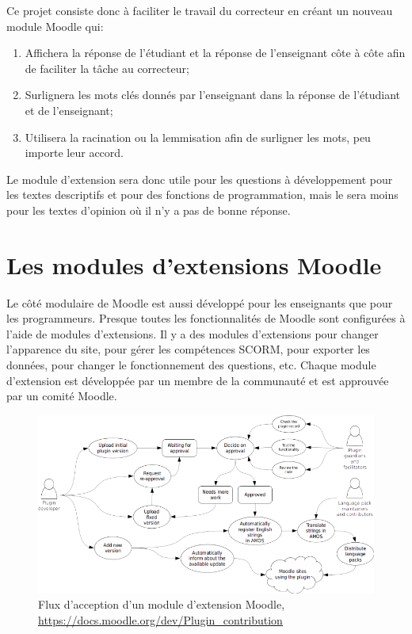 Ce projet consiste donc à faciliter le travail du correcteur en créant un nouveau module Moodle qui:

\begin{enumerate}
  \item Affichera la réponse de l'étudiant et la réponse de l'enseignant côte à côte afin de faciliter la tâche au correcteur;
  \item Surlignera les mots clés donnés par l'enseignant dans la réponse de l'étudiant et de l'enseignant;
  \item Utilisera la racination ou la lemmisation afin de surligner les mots, peu importe leur accord.
\end{enumerate}

Le module d'extension sera donc utile pour les questions à développement pour les textes descriptifs et pour des fonctions de programmation, mais le sera moins pour les textes d'opinion où il n'y a pas de \og bonne \fg{} réponse.

\section{Les modules d'extensions Moodle}

Le côté modulaire de Moodle est aussi développé pour les enseignants que pour les programmeurs.
Presque toutes les fonctionnalités de Moodle sont configurées à l'aide de modules d'extensions.
Il y a des modules d'extensions pour changer l'apparence du site, pour gérer les compétences SCORM, pour exporter les données, pour changer le fonctionnement des questions, etc.
Chaque module d'extension est développée par un membre de la communauté et est approuvée par un comité Moodle.

\begin{figure}[h!]
  \includegraphics[scale=0.7]{images/plugin-contribution-workflow.png}
  \caption[Flux d'acception d'un module d'extension Moodle]{Flux d'acception d'un module d'extension Moodle, \href{https://docs.moodle.org/dev/Plugin_contribution}{\mbox{https://docs.moodle.org/dev/Plugin\_contribution}}}
\end{figure}

